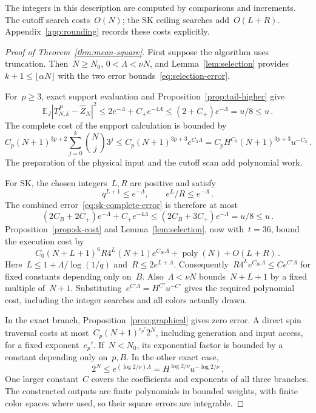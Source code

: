 \documentclass[10pt]{article}
\theoremstyle{plain}
\theoremstyle{definition}
\theoremstyle{remark}
\begin{document}
The integers in this description are computed by comparisons and increments. The cutoff search costs~$O(N)$; the SK ceiling searches add~$O(L+R)$. Appendix~\ref{app:rounding} records these costs explicitly.

\begin{proof}[Proof of Theorem~\ref{thm:mean-square}]
First suppose the algorithm uses truncation. Then~$N\ge N_0$, $0<\Lambda<\nu N$, and Lemma~\ref{lem:selection} provides~$k+1\le\lfloor\alpha N\rfloor$ with the two error bounds~\eqref{eq:selection-error}.

For~$p\ge3$, exact support evaluation and Proposition~\ref{prop:tail-higher} give
\begin{equation*}
 \mathbb E_J|T^P_{N,k}-\hat Z_N|^2
 \le2e^{-\Lambda}+C_+e^{-4\Lambda}
 \le(2+C_+)e^{-\Lambda}=u/8\le u\,.
\end{equation*}
The complete cost of the support calculation is bounded by
\begin{equation*}
 C_p(N+1)^{3p+2}\sum_{j=0}^{k}\binom Nj3^j
 \le C_p(N+1)^{3p+3}e^{C_3\Lambda}
 =C_pH^{C_3}(N+1)^{3p+3}u^{-C_3}\,.
\end{equation*}
The preparation of the physical input and the cutoff scan add polynomial work.

For SK, the chosen integers~$L,R$ are positive and satisfy
\begin{equation*}
 q^{L+1}\le e^{-\Lambda},\qquad e^L/R\le e^{-\Lambda}\,.
\end{equation*}
The combined error~\eqref{eq:sk-complete-error} is therefore at most
\begin{equation*}
 (2C_B+2C_+)e^{-\Lambda}+C_+e^{-4\Lambda}
 \le(2C_B+3C_+)e^{-\Lambda}=u/8\le u\,.
\end{equation*}
Proposition~\ref{prop:sk-cost} and Lemma~\ref{lem:selection}, now with~$t=36$, bound the execution cost by
\begin{equation*}
 C_0(N+L+1)^6R4^L(N+1)e^{C_{36}\Lambda}
 +\operatorname{poly}(N)+O(L+R)\,.
\end{equation*}
Here~$L\le1+\Lambda/\log(1/q)$ and~$R\le2e^{L+\Lambda}$. Consequently~$R4^Le^{C_{36}\Lambda}\le Ce^{C'\Lambda}$ for fixed constants depending only on~$B$. Also~$\Lambda<\nu N$ bounds~$N+L+1$ by a fixed multiple of~$N+1$. Substituting~$e^{C'\Lambda}=H^{C'}u^{-C'}$ gives the required polynomial cost, including the integer searches and all colors actually drawn.

In the exact branch, Proposition~\ref{prop:graphical} gives zero error. A direct spin traversal costs at most~$C_p(N+1)^{c_p'}2^N$, including generation and input access, for a fixed exponent~$c_p'$. If~$N<N_0$, its exponential factor is bounded by a constant depending only on~$p,B$. In the other exact case,
\begin{equation}\label{eq:exact-cost}
 2^N\le e^{(\log2/\nu)\Lambda}=H^{\log2/\nu}u^{-\log2/\nu}\,.
\end{equation}
One larger constant~$C$ covers the coefficients and exponents of all three branches. The constructed outputs are finite polynomials in bounded weights, with finite color spaces where used, so their square errors are integrable.
\end{proof}
\end{document}
